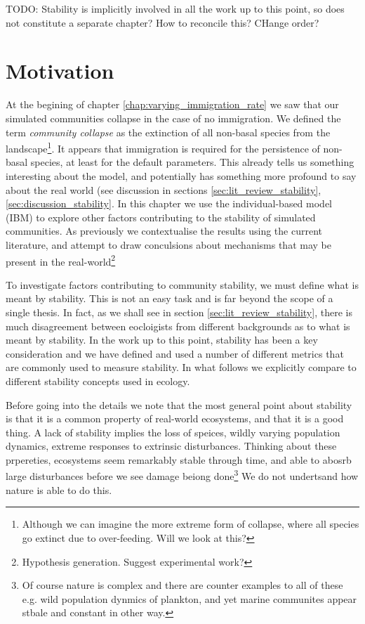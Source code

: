 TODO: Stability is implicitly involved in all the work up to this point, so does not constitute a separate chapter? How to reconcile this? CHange order?

\section{Motivation}
\label{sec:motivate_stability}

At the begining of chapter \ref{chap:varying_immigration_rate} we saw that our simulated communities collapse in the case of no immigration. We defined the term \emph{community collapse} as the extinction of all non-basal species from the landscape\footnote{Although we can imagine the more extreme form of collapse, where all species go extinct due to over-feeding. Will we look at this?}. It appears that immigration is required for the persistence of non-basal species, at least for the default parameters. This already tells us something interesting about the model, and potentially has something more profound to say about the real world (see discussion in sections \ref{sec:lit_review_stability}, \ref{sec:discussion_stability}. 
In this chapter we use the individual-based model (IBM) to explore other factors contributing to the stability of simulated communities. As previously we contextualise the results using the current literature, and attempt to draw conculsions about mechanisms that may be present in the real-world\footnote{Hypothesis generation. Suggest experimental work?}    

To investigate factors contributing to community stability, we must define what is meant by stability. This is not an easy task and is far beyond the scope of a single thesis. In fact, as we shall see in section \ref{sec:lit_review_stability}, there is much disagreement between eocloigists from different backgrounds as to what is meant by stability. In the work up to this point, stability has been a key consideration and we have defined and used a number of different metrics that are commonly used to measure stability. In what follows we explicitly compare to different stability concepts used in ecology.

Before going into the details we note that the most general point about stability is that it is a common property of real-world ecosystems, and that it is a good thing. A lack of stability implies the loss of speices, wildly varying population dynamics, extreme responses to extrinsic disturbances. Thinking about these prpereties, ecosystems seem remarkably stable through time, and able to abosrb large disturbances before we see damage beiong done\footnote{Of course nature is complex and there are counter examples to all of these e.g. wild population dynmics of plankton, and yet marine communites appear stbale and constant in other way.} We do not undertsand how nature is able to do this.

